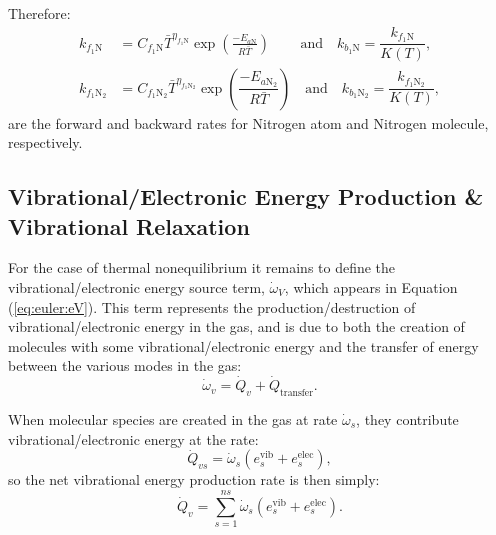 \documentclass[10pt]{article}
\begin{document}
Therefore:
\begin{equation}
 \begin{split}
\label{eq:forward_rates1}
k_{f_1 \text{N}} &= C_{f_1 \text{N}} \bar{T}^{\eta_{f_1 \text{N}}} \exp\left(\frac{-E_{a\text{N}}}{R \bar{T}}\right) \qquad \,\mbox{and}\quad k_{b_1 \text{N}} = \dfrac{k_{f_1 \text{N}}}{K(T)},\\
%
k_{f_1 \text{N}_2} &= C_{f_1 \text{N}_2} \bar{T}^{\eta_{f_1 \text{N}_2}} \exp\left(\dfrac{-E_{a\text{N}_2}}{R \bar{T}}\right) \quad \mbox{and}\quad k_{b_1 \text{N}_2} = \dfrac{k_{f_1 \text{N}_2}}{K(T)},
%
 \end{split}
\end{equation}
are the forward and backward rates for Nitrogen atom and Nitrogen molecule, respectively.


\subsection{Vibrational/Electronic Energy Production \& Vibrational Relaxation}\label{sec:omega_v}

For the case of thermal nonequilibrium it remains to define the vibrational/electronic energy source term, $\dot{\omega}_V$, which appears in Equation (\ref{eq:euler:eV}).  This term represents the production/destruction of vibrational/electronic energy in the gas, and is due to both the creation of molecules with some vibrational/electronic energy and the transfer of energy between the various modes in the gas:
\begin{equation}
  \dot{\omega}_v = \dot{Q}_{v} + \dot{Q}_{\text{transfer}}.
\end{equation}

When molecular species are created in the gas at rate $\dot{\omega}_s$, they contribute vibrational/electronic energy at the rate: 
\begin{equation*}
  \dot{Q}_{vs}=\dot{\omega}_s\left(e^{\text{vib}}_{s} + e^{\text{elec}}_{s}\right),
\end{equation*}
so the net vibrational energy production rate is then simply:
\begin{equation}
  \label{eq:vibrational_energy_production}
  \dot{Q}_{v} = \sum_{s=1}^{ns} \dot{\omega}_s\left(e^{\text{vib}}_{s} + e^{\text{elec}}_{s}\right).
\end{equation}
\end{document}
